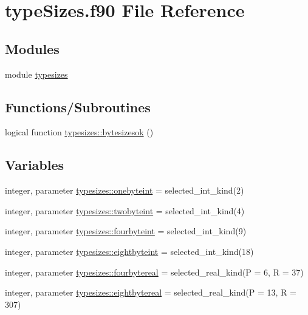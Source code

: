 \hypertarget{typeSizes_8f90}{}\section{type\+Sizes.\+f90 File Reference}
\label{typeSizes_8f90}
\subsection*{Modules}
\begin{DoxyCompactItemize}
\item 
module \hyperlink{namespacetypesizes}{typesizes}
\end{DoxyCompactItemize}
\subsection*{Functions/\+Subroutines}
\begin{DoxyCompactItemize}
\item 
logical function \hyperlink{namespacetypesizes_a146afb3c5f10f03943ceb3c28e91089e}{typesizes\+::bytesizesok} ()
\end{DoxyCompactItemize}
\subsection*{Variables}
\begin{DoxyCompactItemize}
\item 
integer, parameter \hyperlink{namespacetypesizes_aa1f2e4f7a7d6f61a1c684ae370b4b2c4}{typesizes\+::onebyteint} = selected\+\_\+int\+\_\+kind(2)
\item 
integer, parameter \hyperlink{namespacetypesizes_a69e9798b70a7f85aba877b95cd0dcf50}{typesizes\+::twobyteint} = selected\+\_\+int\+\_\+kind(4)
\item 
integer, parameter \hyperlink{namespacetypesizes_ac1638da869cdc25b2ab9a90bea92ff44}{typesizes\+::fourbyteint} = selected\+\_\+int\+\_\+kind(9)
\item 
integer, parameter \hyperlink{namespacetypesizes_a10dcbb5b8bcff788b35e312be2b1f49a}{typesizes\+::eightbyteint} = selected\+\_\+int\+\_\+kind(18)
\item 
integer, parameter \hyperlink{namespacetypesizes_a63d61f1f3d8b3fa297b620f0e3c0b92e}{typesizes\+::fourbytereal} = selected\+\_\+real\+\_\+kind(P = 6, R = 37)
\item 
integer, parameter \hyperlink{namespacetypesizes_a7e57bc93c84af9c608fcea1661caa070}{typesizes\+::eightbytereal} = selected\+\_\+real\+\_\+kind(P = 13, R = 307)
\end{DoxyCompactItemize}
